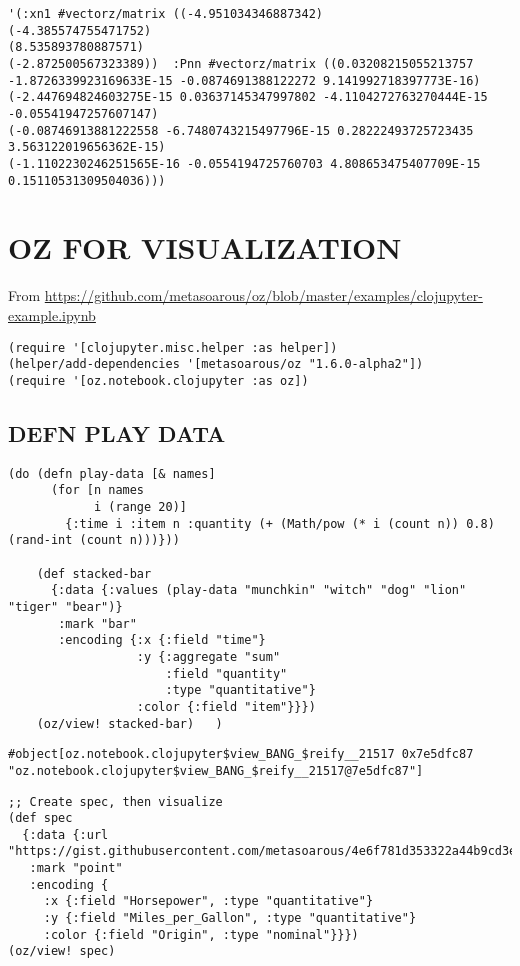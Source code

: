\documentclass[10pt,oneside,x11names]{article}
\begin{document}
\begin{verbatim}
'(:xn1 #vectorz/matrix ((-4.951034346887342)
(-4.385574755471752)
(8.535893780887571)
(-2.872500567323389))  :Pnn #vectorz/matrix ((0.03208215055213757 -1.8726339923169633E-15 -0.0874691388122272 9.141992718397773E-16)
(-2.447694824603275E-15 0.03637145347997802 -4.1104272763270444E-15 -0.05541947257607147)
(-0.08746913881222558 -6.7480743215497796E-15 0.28222493725723435 3.563122019656362E-15)
(-1.1102230246251565E-16 -0.0554194725760703 4.808653475407709E-15 0.15110531309504036)))
\end{verbatim}

\section{OZ FOR VISUALIZATION}
\label{oz-for-visualization}
From
\url{https://github.com/metasoarous/oz/blob/master/examples/clojupyter-example.ipynb}

\begin{verbatim}
(require '[clojupyter.misc.helper :as helper])
(helper/add-dependencies '[metasoarous/oz "1.6.0-alpha2"])
(require '[oz.notebook.clojupyter :as oz])
\end{verbatim}

\subsection{DEFN PLAY DATA}
\label{sec:org7ebc892}

\begin{verbatim}
(do (defn play-data [& names]
      (for [n names
            i (range 20)]
        {:time i :item n :quantity (+ (Math/pow (* i (count n)) 0.8) (rand-int (count n)))}))

    (def stacked-bar
      {:data {:values (play-data "munchkin" "witch" "dog" "lion" "tiger" "bear")}
       :mark "bar"
       :encoding {:x {:field "time"}
                  :y {:aggregate "sum"
                      :field "quantity"
                      :type "quantitative"}
                  :color {:field "item"}}})
    (oz/view! stacked-bar)   )
\end{verbatim}

\begin{verbatim}
#object[oz.notebook.clojupyter$view_BANG_$reify__21517 0x7e5dfc87 "oz.notebook.clojupyter$view_BANG_$reify__21517@7e5dfc87"]
\end{verbatim}


\begin{verbatim}
;; Create spec, then visualize
(def spec
  {:data {:url "https://gist.githubusercontent.com/metasoarous/4e6f781d353322a44b9cd3e4597c532c/raw/cd633d9bb8e0bed4a5b8e66a32b9569ca2147989/cars.json"}
   :mark "point"
   :encoding {
     :x {:field "Horsepower", :type "quantitative"}
     :y {:field "Miles_per_Gallon", :type "quantitative"}
     :color {:field "Origin", :type "nominal"}}})
(oz/view! spec)
\end{verbatim}
\end{document}
